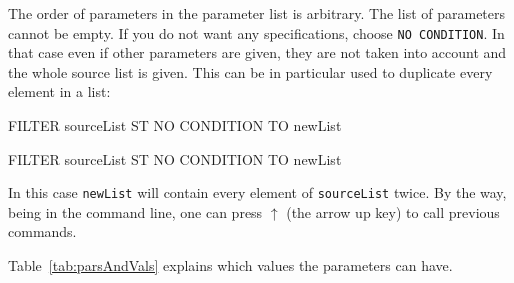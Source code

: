The order of parameters in the parameter list is arbitrary. The list
of parameters cannot be empty. If you do not want any specifications,
choose \texttt{NO CONDITION}. In that case even if other parameters
are given, they are not taken into account and the whole source list
is given. This can be in particular used to duplicate every element in
a list:
\\\begin{tcolorbox}
  FILTER sourceList ST NO CONDITION TO newList

  FILTER sourceList ST NO CONDITION TO newList
\end{tcolorbox}

In this case \texttt{newList} will contain every element of
\texttt{sourceList} twice. By the way, being in the command line, one
can press $\uparrow$ (the arrow up key) to call previous commands.

Table~\ref{tab:parsAndVals} explains which values the parameters can have.

